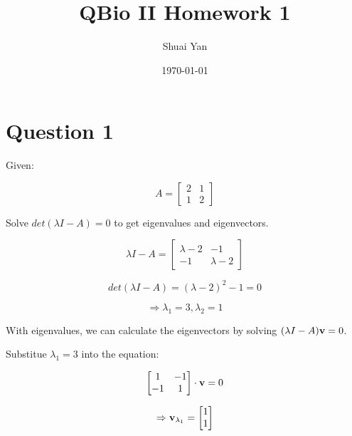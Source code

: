 \documentclass{article}
\title{QBio II Homework 1}
\author{Shuai Yan}
\date{\today}
\begin{document}
\maketitle






\newpage
\section{Question 1}
Given:

\[
    A = 
    \begin{bmatrix}
        2 & 1\\
        1 & 2
    \end{bmatrix}
\]

Solve $det(\lambda I-A)=0$ to get eigenvalues and eigenvectors.

\[
    \lambda I-A= 
    \begin{bmatrix}
        \lambda-2 & -1\\
        -1 & \lambda-2
    \end{bmatrix}
\]

\[
    det(\lambda I-A)=(\lambda-2)^2-1=0
\]

\[
    \Rightarrow \lambda_1=3, \lambda_2=1
\]

With eigenvalues, we can calculate the eigenvectors by solving $(\lambda
I-A)\vb{v}=0$.

Substitue $\lambda_1=3$ into the equation:

\[
    \begin{bmatrix}
        1 & -1\\
        -1 & 1
    \end{bmatrix}
    \cdot \vb{v}=0
\]

\[
    \Rightarrow \vb{v}_{\lambda_1}=
    \begin{bmatrix}
        1\\
        1
    \end{bmatrix}
\]
\end{document}
